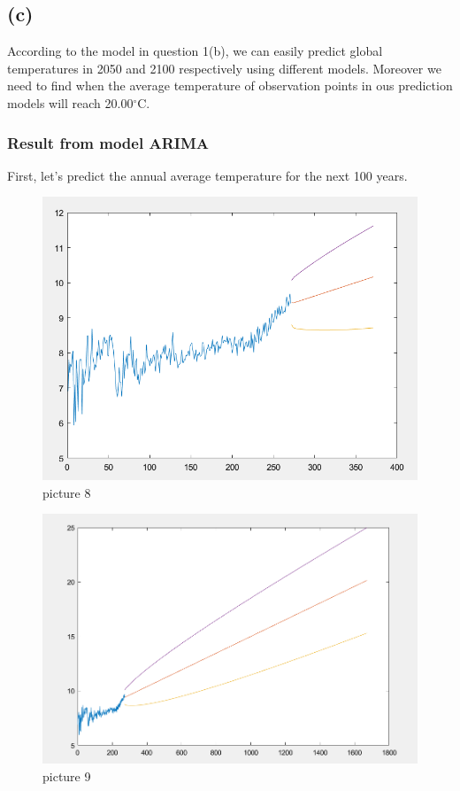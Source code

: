 \documentclass{apmcmthesis}
\def\oc{$^{\circ}$C\;}
\begin{document}
\subsection{(c)}

According to the model in question 1(b), we can easily predict global temperatures in 2050 and 2100 respectively using different models. 
Moreover we need to find when the average temperature of observation points in ous prediction models will reach 20.00\oc.

\subsubsection{Result from model ARIMA}

First, let's predict the annual average temperature for the next 100 years.

\begin{figure}[htbp]
  \centering
  \includegraphics[scale=0.45]{ARIMA prediction 100.png}
  \caption{picture 8}\label{fig8}
\end{figure}

\begin{figure}[htbp]
  \centering
  \includegraphics[scale=0.4]{ARIMA prediction 1400.png}
  \caption{picture 9}\label{fig9}
\end{figure}
\end{document}
